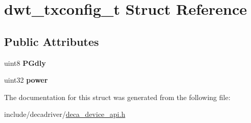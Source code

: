 \hypertarget{structdwt__txconfig__t}{\section{dwt\-\_\-txconfig\-\_\-t Struct Reference}
\label{structdwt__txconfig__t}
}
\subsection*{Public Attributes}
\begin{DoxyCompactItemize}
\item 
\hypertarget{structdwt__txconfig__t_ab6958ba8bdcf728178382d7608d174a0}{uint8 {\bfseries P\-Gdly}}\label{structdwt__txconfig__t_ab6958ba8bdcf728178382d7608d174a0}

\item 
\hypertarget{structdwt__txconfig__t_a587fac4132b28fa0f7cc11cae9e70d66}{uint32 {\bfseries power}}\label{structdwt__txconfig__t_a587fac4132b28fa0f7cc11cae9e70d66}

\end{DoxyCompactItemize}


The documentation for this struct was generated from the following file\-:\begin{DoxyCompactItemize}
\item 
include/decadriver/\hyperlink{deca__device__api_8h}{deca\-\_\-device\-\_\-api.\-h}\end{DoxyCompactItemize}

